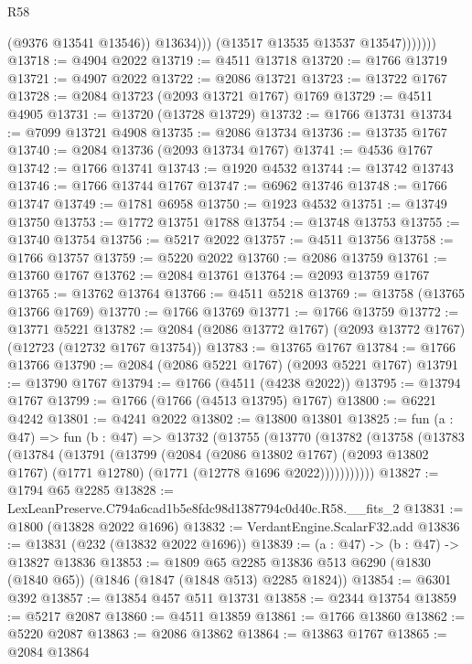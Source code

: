 \begin{lexlean}{R58}
\begin{coremodule}
                        (@9376 @13541 @13546))
                      @13634)))
                (@13517 @13535 @13537 @13547)))))))
@13718 := @4904 @2022
@13719 := @4511 @13718
@13720 := @1766 @13719
@13721 := @4907 @2022
@13722 := @2086 @13721
@13723 := @13722 @1767
@13728 := @2084 @13723 (@2093 @13721 @1767) @1769
@13729 := @4511 @4905
@13731 := @13720 (@13728 @13729)
@13732 := @1766 @13731
@13734 := @7099 @13721 @4908
@13735 := @2086 @13734
@13736 := @13735 @1767
@13740 := @2084 @13736 (@2093 @13734 @1767)
@13741 := @4536 @1767
@13742 := @1766 @13741
@13743 := @1920 @4532
@13744 := @13742 @13743
@13746 := @1766 @13744 @1767
@13747 := @6962 @13746
@13748 := @1766 @13747
@13749 := @1781 @6958
@13750 := @1923 @4532
@13751 := @13749 @13750
@13753 := @1772 @13751 @1788
@13754 := @13748 @13753
@13755 := @13740 @13754
@13756 := @5217 @2022
@13757 := @4511 @13756
@13758 := @1766 @13757
@13759 := @5220 @2022
@13760 := @2086 @13759
@13761 := @13760 @1767
@13762 := @2084 @13761
@13764 := @2093 @13759 @1767
@13765 := @13762 @13764
@13766 := @4511 @5218
@13769 := @13758 (@13765 @13766 @1769)
@13770 := @1766 @13769
@13771 := @1766 @13759
@13772 := @13771 @5221
@13782 := @2084 (@2086 @13772 @1767) (@2093 @13772 @1767) (@12723 (@12732 @1767 @13754))
@13783 := @13765 @1767
@13784 := @1766 @13766
@13790 := @2084 (@2086 @5221 @1767) (@2093 @5221 @1767)
@13791 := @13790 @1767
@13794 := @1766 (@4511 (@4238 @2022))
@13795 := @13794 @1767
@13799 := @1766 (@1766 (@4513 @13795) @1767)
@13800 := @6221 @4242
@13801 := @4241 @2022
@13802 := @13800 @13801
@13825 := fun (a : @47) =>
  fun (b : @47) =>
  @13732
    (@13755
      (@13770
        (@13782
          (@13758
            (@13783
              (@13784
                (@13791
                  (@13799
                    (@2084
                      (@2086 @13802 @1767)
                      (@2093 @13802 @1767)
                      (@1771 @12780)
                      (@1771 (@12778 @1696 @2022)))))))))))
@13827 := @1794 @65 @2285
@13828 := LexLeanPreserve.C794a6cad1b5e8fdc98d1387794c0d40c.R58.__fits_2
@13831 := @1800 (@13828 @2022 @1696)
@13832 := VerdantEngine.ScalarF32.add
@13836 := @13831 (@232 (@13832 @2022 @1696))
@13839 := (a : @47) -> (b : @47) -> @13827 @13836
@13853 := @1809
    @65
    @2285
    @13836
    @513
    @6290
    (@1830 (@1840 @65))
    (@1846 (@1847 (@1848 @513) @2285 @1824))
@13854 := @6301 @392
@13857 := @13854 @457 @511 @13731
@13858 := @2344 @13754
@13859 := @5217 @2087
@13860 := @4511 @13859
@13861 := @1766 @13860
@13862 := @5220 @2087
@13863 := @2086 @13862
@13864 := @13863 @1767
@13865 := @2084 @13864

\end{coremodule}
\end{lexlean}
